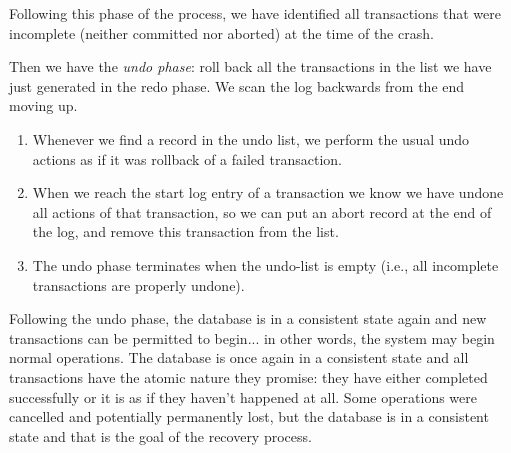 Following this phase of the process, we have identified all transactions that were incomplete (neither committed nor aborted) at the time of the crash. 

Then we have the \textit{undo phase}: roll back all the transactions in the list we have just generated in the redo phase. We scan the log backwards from the end moving up.

\begin{enumerate}
	\item Whenever we find a record in the undo list, we perform the usual undo actions as if it was rollback of a failed transaction.
	\item When we reach the start log entry of a transaction we know we have undone all actions of that transaction, so we can put an abort record at the end of the log, and remove this transaction from the list.
	\item The undo phase terminates when the undo-list is empty (i.e., all incomplete transactions are properly undone).
\end{enumerate}

Following the undo phase, the database is in a consistent state again and new transactions can be permitted to begin... in other words, the system may begin normal operations. The database is once again in a consistent state and all transactions have the atomic nature they promise: they have either completed successfully or it is as if they haven't happened at all. Some operations were cancelled and potentially permanently lost, but the database is in a consistent state and that is the goal of the recovery process.




